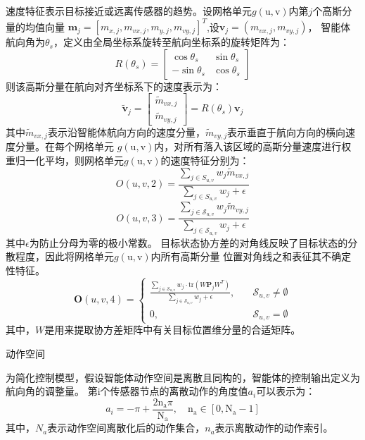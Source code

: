 速度特征表示目标接近或远离传感器的趋势。设网格单元$g(\mathrm{u,v})$内第$j$个高斯分量的均值向量
$\mathbf{m}_{j}=\left[m_{x,j},m_{vx,j},m_{y,j},m_{vy,j}\right]^{T}$,设$\mathbf{v}_{j}=(m_{vx,j},m_{vy,j})$，
智能体航向角为$\theta_s$，定义由全局坐标系旋转至航向坐标系的旋转矩阵为：
\begin{equation}
R(\theta_s)=\begin{bmatrix}\cos\theta_s&\sin\theta_s\\-\sin\theta_s&\cos\theta_s\end{bmatrix}
\end{equation}
则该高斯分量在航向对齐坐标系下的速度表示为：
\begin{equation}
\tilde{\mathbf{v}}_j=\begin{bmatrix}\widetilde{m}_{vx,j}\\\widetilde{m}_{vy,j}\end{bmatrix}=R(\theta_s)\mathbf{v}_j
\end{equation}
其中$\tilde{m}_{vx,j}$表示沿智能体航向方向的速度分量，$\tilde{m}_{vy,j}$表示垂直于航向方向的横向速度分量。在每个网格单元
$g(\mathrm{u,v})$内，对所有落入该区域的高斯分量速度进行权重归一化平均，则网格单元$g(\mathrm{u,v})$的速度特征分别为：
\begin{equation}
O(u,v,2)=\frac{\sum_{j\in S_{u,v}}w_{j}\widetilde{m}_{vx,j}}{\sum_{j\in S_{u,v}}w_{j}+\epsilon}
\end{equation}
\begin{equation}
O(u,v,3)=\frac{\sum_{j\in\mathcal{S}_{u,v}}w_{j}\widetilde{m}_{vy,j}}{\sum_{j\in\mathcal{S}_{u,v}}w_{j}+\epsilon}
\end{equation}
其中$\epsilon$为防止分母为零的极小常数。
目标状态协方差的对角线反映了目标状态的分散程度，因此将网格单元$g(\mathrm{u,v})$内所有高斯分量
位置对角线之和表征其不确定性特征。
\begin{equation}
\mathbf{O}(u,v,4)=\begin{cases}\frac{\sum_{j\in\mathcal{S}_{u,v}}w_j\cdot\mathrm{tr}\left(W\mathbf{P}_jW^T\right)}{\sum_{j\in\mathcal{S}_{u,v}}w_j+\epsilon},&\quad\mathcal{S}_{u,v}\neq\emptyset\\0,&\quad\mathcal{S}_{u,v}=\emptyset\end{cases}
\end{equation}
其中，$W$是用来提取协方差矩阵中有关目标位置维分量的合适矩阵。

动作空间

为简化控制模型，假设智能体动作空间是离散且同构的，智能体的控制输出定义为航向角的调整量。
第$\mathrm{i}$个传感器节点的离散动作的角度值$a_{i}$可以表示为：
\begin{equation}
a_i=-\pi+\frac{2\mathrm{n_a}\pi}{\mathrm{N_a}},\quad\mathrm{n_a\in[0,N_a-1]}
\end{equation}
其中，$N_a$表示动作空间离散化后的动作集合，$n_a$表示离散动作的动作索引。

